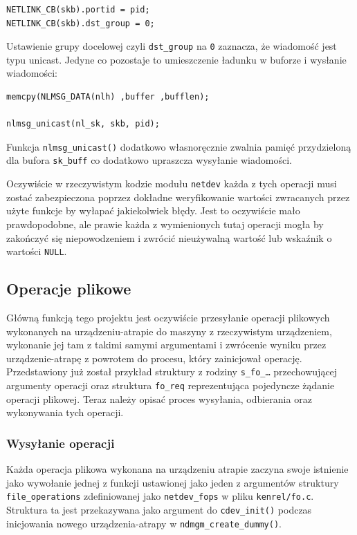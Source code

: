 \documentclass[11pt]{scrartcl}
\begin{document}
\begin{verbatim}
NETLINK_CB(skb).portid = pid;
NETLINK_CB(skb).dst_group = 0;
\end{verbatim}

Ustawienie grupy docelowej czyli \texttt{dst\_group} na \texttt{0} zaznacza, że wiadomość jest typu unicast. Jedyne co pozostaje to umieszczenie ładunku w buforze i wysłanie wiadomości:

\begin{verbatim}
memcpy(NLMSG_DATA(nlh) ,buffer ,bufflen);

nlmsg_unicast(nl_sk, skb, pid);
\end{verbatim}

Funkcja \texttt{nlmsg\_unicast()} dodatkowo własnoręcznie zwalnia pamięć przydzieloną dla bufora \texttt{sk\_buff} co dodatkowo upraszcza wysyłanie wiadomości.

Oczywiście w rzeczywistym kodzie modułu \texttt{netdev} każda z tych operacji musi zostać zabezpieczona poprzez dokładne weryfikowanie wartości zwracanych przez użyte funkcje by wyłapać jakiekolwiek błędy.  Jest to oczywiście mało prawdopodobne, ale prawie każda z wymienionych tutaj operacji mogła by zakończyć się niepowodzeniem i zwrócić nieużywalną wartość lub wskaźnik o wartości \texttt{NULL}.

\subsection{Operacje plikowe}
\label{foops}

Główną funkcją tego projektu jest oczywiście przesyłanie operacji plikowych wykonanych na urządzeniu-atrapie do maszyny z rzeczywistym urządzeniem, wykonanie jej tam z takimi samymi argumentami i zwrócenie wyniku przez urządzenie-atrapę z powrotem do procesu, który zainicjował operację. Przedstawiony już został przykład struktury z rodziny \texttt{s\_fo\_\ldots} przechowującej argumenty operacji oraz struktura \texttt{fo\_req} reprezentująca pojedyncze żądanie operacji plikowej.  Teraz należy opisać proces wysyłania, odbierania oraz wykonywania tych operacji.

\subsubsection{Wysyłanie operacji}
\label{fosend}

Każda operacja plikowa wykonana na urządzeniu atrapie zaczyna swoje istnienie jako wywołanie jednej z funkcji ustawionej jako jeden z argumentów struktury \texttt{file\_operations} zdefiniowanej jako \texttt{netdev\_fops} w pliku \texttt{kenrel/fo.c}. Struktura ta jest przekazywana jako argument do \texttt{cdev\_init()} podczas inicjowania nowego urządzenia-atrapy w \texttt{ndmgm\_create\_dummy()}.
\end{document}
